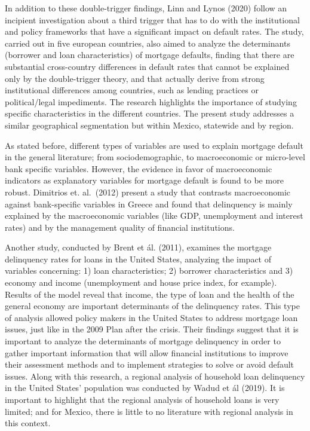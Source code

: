 \documentclass[
]{article}
\begin{document}
In addition to these double-trigger findings, Linn and Lynos (2020)
follow an incipient investigation about a third trigger that has to do
with the institutional and policy frameworks that have a significant
impact on default rates. The study, carried out in five european
countries, also aimed to analyze the determinants (borrower and loan
characteristics) of mortgage defaults, finding that there are
substantial cross-country differences in default rates that cannot be
explained only by the double-trigger theory, and that actually derive
from strong institutional differences among countries, such as lending
practices or political/legal impediments. The research highlights the
importance of studying specific characteristics in the different
countries. The present study addresses a similar geographical
segmentation but within Mexico, statewide and by region.

As stated before, different types of variables are used to explain
mortgage default in the general literature; from sociodemographic, to
macroeconomic or micro-level bank specific variables. However, the
evidence in favor of macroeconomic indicators as explanatory variables
for mortgage default is found to be more robust. Dimitrios et.
al.~(2012) present a study that contrasts macroeconomic against
bank-specific variables in Greece and found that delinquency is mainly
explained by the macroeconomic variables (like GDP, unemployment and
interest rates) and by the management quality of financial institutions.

Another study, conducted by Brent et ál. (2011), examines the mortgage
delinquency rates for loans in the United States, analyzing the impact
of variables concerning: 1) loan characteristics; 2) borrower
characteristics and 3) economy and income (unemployment and house price
index, for example). Results of the model reveal that income, the type
of loan and the health of the general economy are important determinants
of the delinquency rates. This type of analysis allowed policy makers in
the United States to address mortgage loan issues, just like in the 2009
Plan after the crisis. Their findings suggest that it is important to
analyze the determinants of mortgage delinquency in order to gather
important information that will allow financial institutions to improve
their assessment methods and to implement strategies to solve or avoid
default issues. Along with this research, a regional analysis of
household loan delinquency in the United States' population was
conducted by Wadud et ál (2019). It is important to highlight that the
regional analysis of household loans is very limited; and for Mexico,
there is little to no literature with regional analysis in this context.
\end{document}

